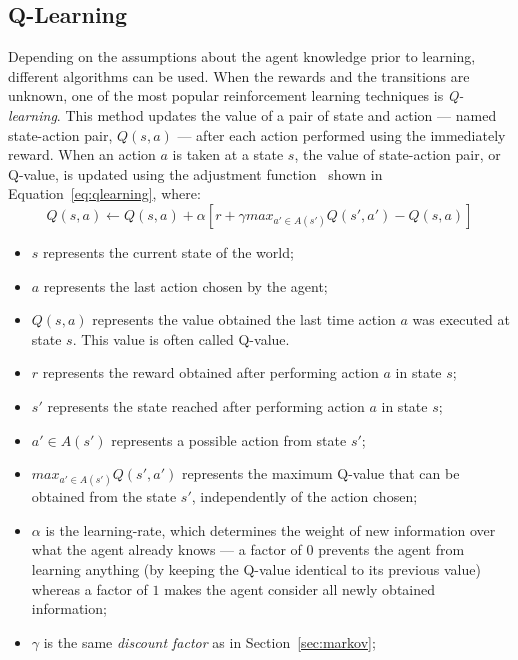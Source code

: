 \subsection{Q-Learning}
\label{subsec:ql}

Depending on the assumptions about the agent knowledge prior to learning, different algorithms can be used. 
When the rewards and the transitions are unknown, one of the most popular reinforcement learning techniques is \textit{Q-learning}. 
This method updates the value of a pair of state and action --- named state-action pair, $Q(s,a)$ ---
after each action performed using the immediately reward. 
When an action $a$ is taken at a state $s$, the value of state-action pair, or Q-value,
is updated using the adjustment function~\cite{amato2010highlevel} shown in Equation~\ref{eq:qlearning}, where:
\begin{equation} \label{eq:qlearning}
	Q(s,a) \leftarrow Q(s,a) + \alpha[r + \gamma max_{a' \in A(s')}Q(s',a') - Q(s,a)]
\end{equation}

\begin{itemize}
\item $s$ represents the current state of the world;
\item $a$ represents the last action chosen by the agent;
\item $ Q(s,a) $ represents the value obtained the last time action $a$ was executed at state $s$.
This value is often called Q-value.
\item $r$ represents the reward obtained after performing action $a$ in state $s$;
\item $s'$ represents the state reached after performing action $a$ in state $s$;
\item $a' \in A(s')$ represents a possible action from state $s'$;
\item $max_{a' \in A(s')}Q(s',a')$ represents the maximum Q-value that can be obtained from the state $s'$, independently of the action chosen;
\item $\alpha$ is the learning-rate, which determines the weight of new information over what the agent already knows --- a factor of $0$ prevents the agent from learning anything (by keeping the Q-value identical to its previous value) whereas a factor of $1$ makes the agent consider all newly obtained information;
\item $\gamma$ is the same \textit{discount factor} as in Section~\ref{sec:markov};
\end{itemize}

